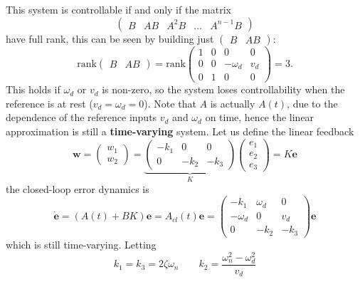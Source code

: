 \documentclass[10pt, a4paper]{report}
\begin{document}
This system is controllable if and only if the matrix\begin{equation}
    \begin{pmatrix}
        B & AB & A^2B & \dots & A^{n-1}B
    \end{pmatrix}
\end{equation}
have full rank, this can be seen by building just $\begin{pmatrix}
        B & AB 
    \end{pmatrix}$:\begin{equation}
        \text{rank}\begin{pmatrix}
        B & AB 
    \end{pmatrix}=\text{rank}\begin{pmatrix}
        1&0&0&0\\ 
        0&0&-\omega_d&v_d\\ 
        0&1&0&0
    \end{pmatrix}=3.
    \end{equation}
This holds if $\omega_d$ or $v_d$ is non-zero, so the system loses controllability when the reference is at rest ($v_d=\omega_d=0$).
Note that $A$ is actually $A(t)$, due to the dependence of the reference inputs $v_d$ and $\omega_d$ on time, hence the linear approximation is still a \textbf{time-varying} system. Let us define the linear feedback\begin{equation}
    \mathbf w=\begin{pmatrix}
        w_1\\w_2
    \end{pmatrix}=\underbrace{\begin{pmatrix}
        -k_1&0&0\\0&-k_2&-k_3
    \end{pmatrix}}_{K}\begin{pmatrix}
        e_1\\e_2\\e_3
    \end{pmatrix}=K\mathbf e
\end{equation}
the closed-loop error dynamics is\begin{equation}
    \dot{\mathbf e}=(A(t)+BK)\mathbf e=A_{cl}(t)\mathbf e=\begin{pmatrix}
        -k_1&\omega_d&0\\-\omega_d&0&v_d\\0&-k_2&-k_3
    \end{pmatrix}\mathbf e
\end{equation}
which is still time-varying. Letting\begin{equation}
    k_1=k_3=2\zeta \omega_n\qquad k_2=\frac{\omega_n^2-\omega_d^2}{v_d}
\end{equation}
\end{document}
